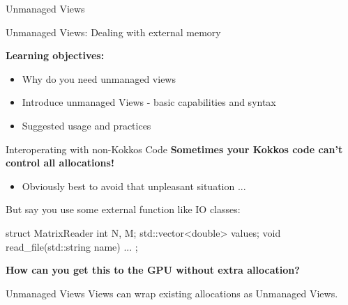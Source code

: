 \begin{frame}[fragile]{Unmanaged Views}

  {\Huge Unmanaged Views: Dealing with external memory}

  \vspace{20pt}

  \textbf{Learning objectives:}
  \begin{itemize}
    \item{Why do you need unmanaged views}
    \item{Introduce unmanaged Views - basic capabilities and syntax}
    \item{Suggested usage and practices}
  \end{itemize}

  \vspace{-20pt}

\end{frame}

\begin{frame}[fragile]{Interoperating with non-Kokkos Code}
   \textbf{Sometimes your Kokkos code can't control all allocations!}

   \begin{itemize}
	   \item Obviously best to avoid that unpleasant situation ...
   \end{itemize}

   But say you use some external function like IO classes:

\begin{code}[keywords={int,vector,string,double}]
struct MatrixReader {
  int N, M;
  std::vector<double> values;
  void read_file(std::string name) {...}
};
\end{code}

\pause
	\textbf{How can you get this to the GPU without extra allocation?}

	\pause
	\begin{block}{Unmanaged Views}
	  Views can wrap existing allocations as Unmanaged Views.
	\end{block}

\end{frame}

